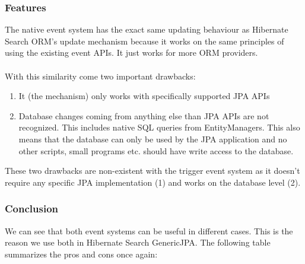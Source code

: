 \subsubsection{Features}
The native event system has the exact same updating behaviour as Hibernate Search ORM's update mechanism because it works on the same principles of using the existing event APIs. It just works for more ORM providers.
\\\\
With this similarity come two important drawbacks:
\begin{enumerate}
	\item It (the mechanism) only works with specifically supported JPA APIs
	\item Database changes coming from anything else than JPA APIs are not recognized. This includes native SQL queries from EntityManagers. This also means that the database can only be used by the JPA application and no other scripts, small programs etc. should have write access to the database.
\end{enumerate}
\noindent
These two drawbacks are non-existent with the trigger event system as it doesn't require any specific JPA implementation (1) and works on the database level (2).

\subsubsection{Conclusion}
We can see that both event systems can be useful in different cases. This is the reason we use both in Hibernate Search GenericJPA. The following table summarizes the pros and cons once again:

